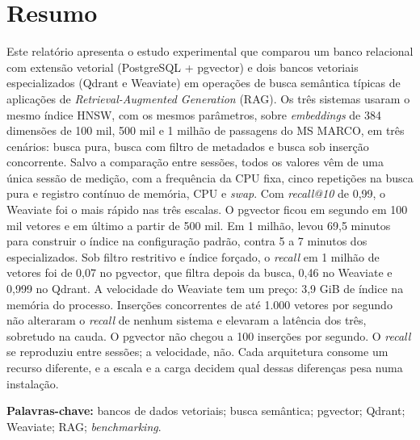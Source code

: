 
\section*{Resumo}

Este relatório apresenta o estudo experimental que comparou um banco relacional com extensão vetorial (PostgreSQL + pgvector) e dois bancos vetoriais especializados (Qdrant e Weaviate) em operações de busca semântica típicas de aplicações de \textit{Retrieval-Augmented Generation} (RAG). Os três sistemas usaram o mesmo índice HNSW, com os mesmos parâmetros, sobre \textit{embeddings} de 384 dimensões de 100 mil, 500 mil e 1 milhão de passagens do MS MARCO, em três cenários: busca pura, busca com filtro de metadados e busca sob inserção concorrente. Salvo a comparação entre sessões, todos os valores vêm de uma única sessão de medição, com a frequência da CPU fixa, cinco repetições na busca pura e registro contínuo de memória, CPU e \textit{swap}. Com \textit{recall@10} de 0,99, o Weaviate foi o mais rápido nas três escalas. O pgvector ficou em segundo em 100 mil vetores e em último a partir de 500 mil. Em 1 milhão, levou 69,5 minutos para construir o índice na configuração padrão, contra 5 a 7 minutos dos especializados. Sob filtro restritivo e índice forçado, o \textit{recall} em 1 milhão de vetores foi de 0,07 no pgvector, que filtra depois da busca, 0,46 no Weaviate e 0,999 no Qdrant. A velocidade do Weaviate tem um preço: 3,9 GiB de índice na memória do processo. Inserções concorrentes de até 1.000 vetores por segundo não alteraram o \textit{recall} de nenhum sistema e elevaram a latência dos três, sobretudo na cauda. O pgvector não chegou a 100 inserções por segundo. O \textit{recall} se reproduziu entre sessões; a velocidade, não. Cada arquitetura consome um recurso diferente, e a escala e a carga decidem qual dessas diferenças pesa numa instalação.

\noindent\textbf{Palavras-chave:} bancos de dados vetoriais; busca semântica; pgvector; Qdrant; Weaviate; RAG; \textit{benchmarking}.
